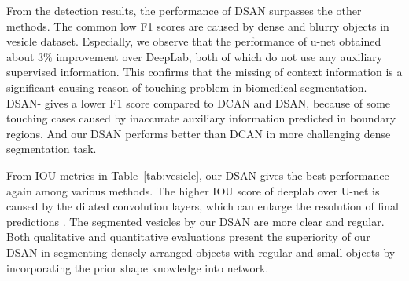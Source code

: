 From the detection results, the performance of DSAN surpasses the other methods.
The common low F1 scores are caused by dense and blurry objects in vesicle dataset.
Especially, we observe that the performance of u-net obtained about $3\%$ improvement over DeepLab, both of which do not use any auxiliary supervised information.
This confirms that the missing of context information is a significant causing reason of touching problem in biomedical segmentation.
DSAN- gives a lower F1 score compared to DCAN and DSAN, because of some touching cases caused by inaccurate auxiliary information predicted in boundary regions.
And our DSAN performs better than DCAN in more challenging dense segmentation task.

From IOU metrics in Table~\ref{tab:vesicle}, our DSAN gives the best performance again among various methods.
The higher IOU score of deeplab over U-net is caused by the dilated convolution layers, which can enlarge the resolution of final predictions \cite{Chen2014a}.
The segmented vesicles by our DSAN are more clear and regular.
Both qualitative and quantitative evaluations present the superiority of our DSAN in segmenting densely arranged objects with regular and small objects by incorporating the prior shape knowledge into network.


